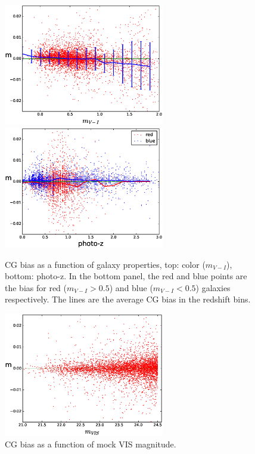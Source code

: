 \documentclass[useAMS,usenatbib]{mn2e}
\begin{document}
%
\begin{figure}
\includegraphics[width=7.0cm]{zcolor17.eps}
\includegraphics[width=7.0cm]{zphotoz17.eps}
\caption{CG bias as a function of galaxy properties, top: color
  ($m_{V-I}$), bottom: photo-z. In the bottom panel, the red and blue
  points are the bias for red ($m_{V-I}>0.5$) and blue ($m_{V-I}<0.5$)
  galaxies respectively. The lines are the average CG bias in the
  redshift bins.}
\label{fig:cg2color}
\end{figure}
%
\begin{figure}
\includegraphics[width=7.0cm]{zcgb-magt17.eps}
\caption{CG bias as a function of mock VIS magnitude. }
\label{fig:cg2magvis}
\end{figure}
%
\end{document}
